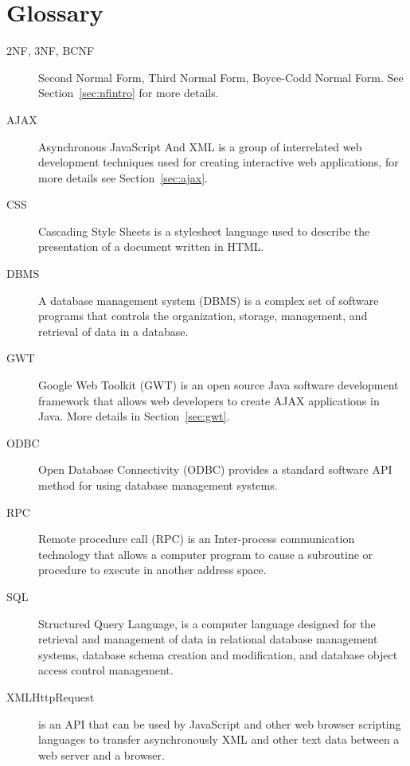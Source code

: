 \section{Glossary}
\begin{description}
	\item[2NF, 3NF, BCNF] Second Normal Form, Third Normal Form, Boyce-Codd Normal Form. See Section~\ref{sec:nfintro} for more details.
	\item[AJAX] Asynchronous JavaScript And XML is a group of interrelated web development techniques used for creating interactive web applications, for more details see Section~\ref{sec:ajax}.
	\item[CSS] Cascading Style Sheets is a stylesheet language used to describe the presentation of a document written in HTML.
	\item[DBMS] A database management system (DBMS) is a complex set of software programs that controls the organization, storage, management, and retrieval of data in a database.
	\item[GWT] Google Web Toolkit (GWT) is an open source Java software development framework that allows web developers to create AJAX applications in Java. More details in Section~\ref{sec:gwt}.
	\item[ODBC] Open Database Connectivity (ODBC) provides a standard software API method for using database management systems.
	\item[RPC] Remote procedure call (RPC) is an Inter-process communication technology that allows a computer program to cause a subroutine or procedure to execute in another address space.
	\item[SQL] Structured Query Language, is a computer language designed for the retrieval and management of data in relational database management systems, database schema creation and modification, and database object access control management.
	\item[XMLHttpRequest] is an API that can be used by JavaScript and other web browser scripting languages to transfer asynchronously XML and other text data between a web server and a browser.
\end{description}
